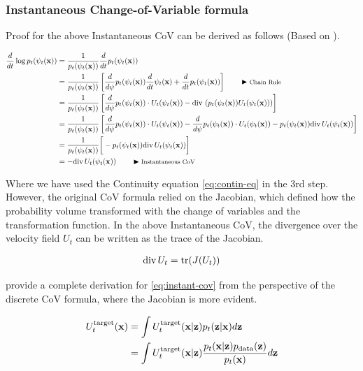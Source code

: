 \documentclass[a4paper, 11pt]{article}
\begin{document}
\subsubsection{Instantaneous Change-of-Variable formula}

Proof for the above Instantaneous CoV can be derived as follows (Based on \cite{mathieu2020riemannian}).

\begin{align}
    \frac{d}{dt} \log p_t(\psi_t(\vx)) &=  \frac{1}{p_t(\psi_t(\vx))}\frac{d}{dt}p_t(\psi_t(\vx)) \\
    &=  \frac{1}{p_t(\psi_t(\vx))}\left [\frac{d}{d\psi}p_t(\psi_t(\vx)) \frac{d}{dt}\psi_t(\vx) + \frac{d}{dt}p_t(\psi_t(\vx)) \right ]  \eqcomment{Chain Rule} \\
    &= \frac{1}{p_t(\psi_t(\vx))} \left [\frac{d}{d\psi}p_t(\psi_t(\vx)) \cdot U_t(\psi_t(\vx)) - \diver \left (p_t(\psi_t(\vx)) U_t(\psi_t(\vx)) \right ) \right ] \\
    &= \frac{1}{p_t(\psi_t(\vx))} \left [\frac{d}{d\psi}p_t(\psi_t(\vx)) \cdot U_t(\psi_t(\vx)) - \frac{d}{d\psi}p_t(\psi_t(\vx)) \cdot U_t(\psi_t(\vx)) - p_t(\psi_t(\vx)) \diver U_t(\psi_t(\vx))  \right ] \\
    &= \frac{1}{p_t(\psi_t(\vx))} \bigg [- p_t(\psi_t(\vx)) \diver U_t(\psi_t(\vx))  \bigg ] \\
    &= - \diver U_t(\psi_t(\vx)) \eqcomment{Instantaneous CoV} \label{eq:instant-cov}
\end{align}  

Where we have used the Continuity equation \eqref{eq:contin-eq} in the 3rd step. However, the original CoV formula relied on the Jacobian, which defined how the probability volume transformed with the change of variables and the transformation function. In the above Instantaneous CoV, the divergence over the velocity field $U_t$ can be written as the trace of the Jacobian.


\begin{align}
    \diver U_t = \tr(J(U_t))
\end{align} 

\cite{chen2018neural} provide a complete derivation for \eqref{eq:instant-cov} from the perspective of the discrete CoV formula, where the Jacobian is more evident.

\begin{align}
    U_t^{\text{target}}(\vx) &= \int U_t^{\text{target}}(\vx | \vz) p_t(\vz | \vx) d\vz \\
    &=  \int U_t^{\text{target}}(\vx | \vz) \frac{p_t( \vx|\vz)p_{\text{data}}(\vz)}{p_t(\vx)} d\vz \label{eq:marg_vel}
\end{align}
\end{document}
